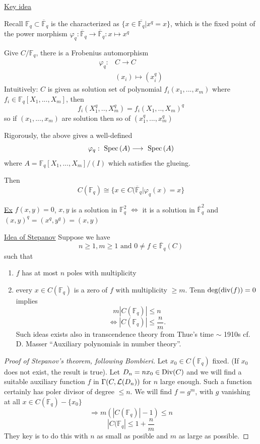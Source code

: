 \documentclass[11pt]{article}
\newcommand{\spec}{\text{ Spec}\,}
\newcommand{\bbf}{\mathbb F}
\newcommand{\call}{{\cal L}}
\renewcommand{\div}{\textnormal{div}}
\newcommand{\Div}{\textnormal{Div}}
\newcommand{\Lrta}{\Longrightarrow}
\newcommand{\lrta}{\longrightarrow}
\newcommand{\Llrta}{\Longleftrightarrow}
\begin{document}
\underline{Key idea}

Recall $\bbf_q\subset \overline{\bbf}_q$ is the characterized as $\{x\in \overline{\bbf_q}|x^q=x\}$, which is the fixed point of the power morphism $\varphi_q:\overline{\bbf}_q\lrta\overline{\bbf}_q:x\longmapsto x^q$

Give $C/\bbf_q$, there is a Frobenius automorphism
$$
\begin{aligned}
\varphi_q:&C\lrta C\\
& (x_i)\longmapsto (x_i^q)
\end{aligned}
$$
Intuitively: $C$ is given as solution set of polynomial $f_i(x_1,...,x_m)$ where $f_i\in\bbf_q[X_1,...,X_m]$, then
$$
f_i(X_1^q,..,X_m^q)=f_i(X_1,..,X_m)^q
$$
so if $(x_1,...,x_m)$ are solution then so of $(x_1^q,...,x_m^q)$


Rigorously, the above gives a well-defined 
$$
\varphi_q:\spec(A)\lrta \spec (A)\\
$$
where $A=\bbf_q[X_1,...,X_m]/(I)$ which satisfies the glueing.

Then
$$
C(\bbf_q)\cong \{x\in C(\overline{\bbf}_q|\varphi_q(x)=x\}
$$

\underline{Ex}
$f(x,y)=0$, $x,y$ is a solution in $\bbf_q^2$ $\Llrta $ it is a solution in $\overline{\bbf}_q^2$ and $(x,y)^q=(x^q,y^q)=(x,y)$

\underline{Idea of Stepanov}
Suppose we have 
$$
n\geq 1, m\geq 1 \text{ and } 0\neq f\in \overline{\bbf}_q(C)
$$
such that 
\begin{enumerate}
\item $f$ has at most $n$ poles with multiplicity
\item every $x\in C(\bbf_q)$ is a zero of $f$ with multiplicity $\geq m$. Tenn $\deg(\div(f))=0$ implies 
$$
m|C(\bbf_q)|\leq n
$$
$$
\Llrta |C(\bbf_q)|\leq \frac{n}{m}.
$$
Such ideas exists also in transcendence theory from Thue's time $\sim$ 1910s cf. D. Masser ``Auxiliary polynomials in number theory''.
\end{enumerate}
\begin{proof}[Proof of Stepanov's theorem, following Bombieri]
Let $x_0\in C(\bbf_q)$ fixed. (If $x_0$ does not exist, the result is true).
Let $D_n=nx_0\in \Div(C)$ and we will find  a suitable auxiliary function $f$ in $\Gamma(C,\call(D_n))$ for $n$ large enough. Such  a function certainly has poler divisor of degree $\leq n$. We will find $f=g^m$, with $g$ vanishing at all $x\in C(\bbf_q)-\{x_0\}$
$$
\Lrta m(|C(\bbf_q)|-1)\leq n
$$
$$
|C(\bbf_q|\leq 1+\frac{n}{m}
$$
They key is to do this with $n$ as small as posible and $m$ as large as possible.
\end{proof}
\end{document}
